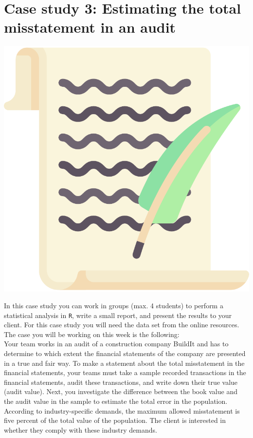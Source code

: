
\begin{minipage}{0.8\textwidth}
\section{Case study 3: Estimating the total misstatement in an audit}
\end{minipage}%
\hfill%
\begin{minipage}{0.1\textwidth}
\includegraphics[width=\linewidth]{Files/Images/lettericon.pdf}
\end{minipage}
\vspace*{.1cm}

In this case study you can work in groups (max. 4 students) to perform a statistical analysis in \texttt{R}, write a small report, and present the results to your client. For this case study you will need the data set  from the online resources. The case you will be working on this week is the following: \\

Your team works in an audit of a construction company BuildIt and has to determine to which extent the financial statements of the company are presented in a true and fair way. To make a statement about the total misstatement in the financial statements, your teams must take a sample recorded transactions in the financial statements, audit these transactions, and write down their true value (audit value). Next, you investigate the difference between the book value and the audit value in the sample to estimate the total error in the population. According to industry-specific demands, the maximum allowed misstatement is five percent of the total value of the population. The client is interested in whether they comply with these industry demands. \\

